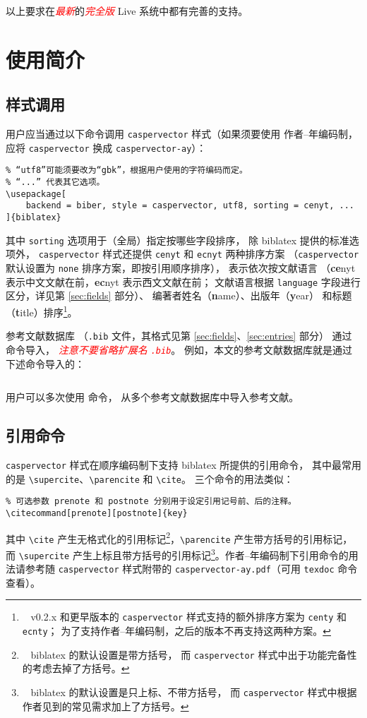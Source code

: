 \documentclass[UTF8]{ctexart}
\newcommand{\myemph}[1]{\emph{\textcolor{red}{#1}}}
\begin{document}
以上要求在\myemph{最新}的\myemph{完全版}
 Live 系统中都有完善的支持。

\section{使用简介}
\subsection{样式调用}

用户应当通过以下命令调用 \verb|caspervector| 样式（如果须要使用
作者--年编码制，应将 \verb|caspervector| 换成 \verb|caspervector-ay|）：
\begin{Verbatim}
% “utf8”可能须要改为“gbk”，根据用户使用的字符编码而定。
% “...” 代表其它选项。
\usepackage[
	backend = biber, style = caspervector, utf8, sorting = cenyt, ...
]{biblatex}
\end{Verbatim}
其中 \verb|sorting| 选项用于（全局）指定按哪些字段排序，
除 biblatex 提供的标准选项\supercite{biblatex}外，%
\verb|caspervector| 样式还提供 \verb|cenyt| 和 \verb|ecnyt| 两种排序方案
（\verb|caspervector| 默认设置为 \verb|none| 排序方案，即按引用顺序排序），
表示依次按文献语言
（\textbf{ce}nyt 表示中文文献在前，\textbf{ec}nyt 表示西文文献在前；
文献语言根据 \verb|language| 字段进行区分，详见第 \ref{sec:fields} 部分）、
编著者姓名（\textbf{n}ame）、出版年（\textbf{y}ear）
和标题（\textbf{t}itle）排序\footnote{\ %
	v0.2.x 和更早版本的 \texttt{caspervector}
	样式支持的额外排序方案为 \texttt{centy} 和 \texttt{ecnty}；
	为了支持作者--年编码制，之后的版本不再支持这两种方案。%
}。

参考文献数据库
（\verb|.bib| 文件，其格式见第 \ref{sec:fields}、\ref{sec:entries} 部分）
通过 \verb|| 命令导入，%
\myemph{注意不要省略扩展名 \texttt{.bib}}。
例如，本文的参考文献数据库就是通过下述命令导入的：
\begin{Verbatim}

\end{Verbatim}
用户可以多次使用 \verb|| 命令，
从多个参考文献数据库中导入参考文献。

\subsection{引用命令}

\verb|caspervector| 样式在顺序编码制下支持 biblatex 所提供的引用命令，
其中最常用的是 \verb|\supercite|、\verb|\parencite| 和 \verb|\cite|。
三个命令的用法类似：
\begin{Verbatim}
% 可选参数 prenote 和 postnote 分别用于设定引用记号前、后的注释。
\citecommand[prenote][postnote]{key}
\end{Verbatim}
其中 \verb|\cite| 产生无格式化的引用标记\footnote{\ %
	biblatex 的默认设置是带方括号，
	而 \texttt{caspervector} 样式中出于功能完备性的考虑去掉了方括号。%
}，\verb|\parencite| 产生带方括号的引用标记，
而 \verb|\supercite| 产生上标且带方括号的引用标记\footnote{\ %
	biblatex 的默认设置是只上标、不带方括号，
	而 \texttt{caspervector} 样式中根据作者见到的常见需求加上了方括号。%
}。作者--年编码制下引用命令的用法请参考随 \verb|caspervector|
样式附带的 \verb|caspervector-ay.pdf|（可用 \verb|texdoc| 命令查看）。
\end{document}

